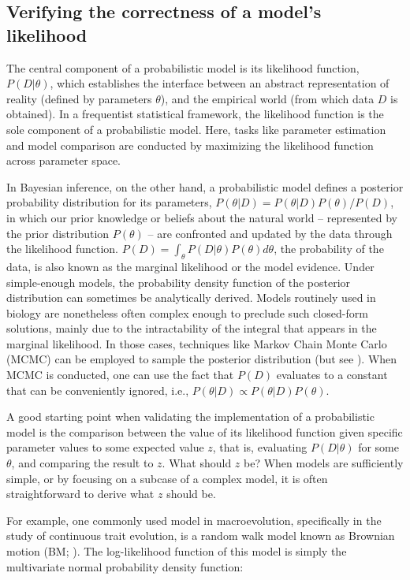 \documentclass[oneside,twocolumn]{article}
\begin{document}
\subsection*{Verifying the correctness of a model's likelihood}

The central component of a probabilistic model is its likelihood
function, $P(D|\theta)$, which establishes the
interface between an abstract representation of reality (defined by parameters $\theta$), and the
empirical world (from which data $D$ is obtained).
In a frequentist statistical framework, the likelihood function is the sole
component of a probabilistic model.
Here, tasks like parameter estimation and model comparison are conducted
by maximizing the likelihood function across parameter
space.

In Bayesian inference, on the other hand, a probabilistic model
defines a posterior probability distribution for its parameters,
$P(\theta|D) = P(\theta|D)P(\theta) / P(D)$, in which our prior
knowledge or beliefs about the natural world -- represented by the prior
distribution $P(\theta)$ -- are confronted and updated by the data through the
likelihood function.
$P(D) = \int_\theta P(D|\theta)P(\theta)d\theta$, the probability of
the data, is also known as the marginal likelihood or the model evidence.
Under simple-enough models, the probability density function of the posterior distribution can sometimes be analytically
derived.
Models routinely used in biology are nonetheless often complex enough
to preclude such closed-form solutions, mainly due to the
intractability of the integral that appears in the marginal
likelihood.
In those cases, techniques like Markov Chain Monte Carlo (MCMC) can be employed to
sample the posterior distribution (but see \citealt{zhang18}).
When MCMC is conducted, one can use the fact that $P(D)$
evaluates to a constant that can be conveniently ignored, i.e., $P(\theta|D) \propto P(\theta|D)P(\theta)$.

A good starting point when validating the implementation of a probabilistic
model is the comparison between the value of its likelihood function given
specific parameter values to some expected value $z$, that
is, evaluating $P(D|\theta)$ for some $\theta$, and comparing the
result to $z$.
What should $z$ be? When models are sufficiently simple, or by focusing
on a subcase of a complex model, it is often straightforward to derive
what $z$ should be.

For example, one commonly used model in macroevolution, specifically in the study
of continuous trait evolution, is a random walk model known as
Brownian motion (BM; \citealt{felsenstein73}).
The log-likelihood function of this model is simply the multivariate
normal probability density function:
\end{document}

